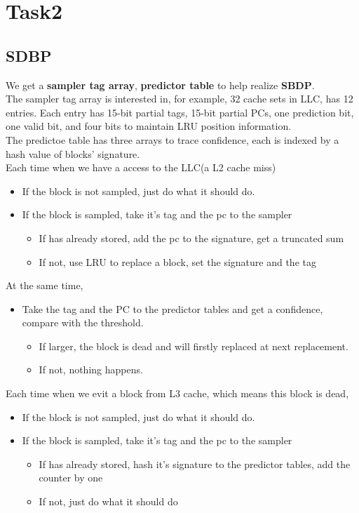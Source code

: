 \documentclass{article}
\begin{document}
\section{Task2}
\subsection{SDBP}
We get a \textbf{sampler tag array}, \textbf{predictor table} to help realize \textbf{SBDP}. \\
The sampler tag array is interested in, for example, 32 cache sets in LLC, has 12 entries. Each entry has 15-bit partial tags, 15-bit partial PCs, one prediction bit, one valid bit, and four bits to maintain LRU position information.\\
The predictoe table has three arrays to trace confidence, each is indexed by a hash value of blocks' signature.\\
Each time when we have a access to the LLC(a L2 cache miss)
\begin{itemize}
    \item If the block is not sampled, just do what it should do.
    \item If the block is sampled, take it's tag and the pc to the sampler
        \begin{itemize}
            \item If has already stored, add the pc to the signature, get a truncated sum
            \item If not, use LRU to replace a block, set the signature and the tag
        \end{itemize}
\end{itemize}
At the same time,
\begin{itemize}
    \item Take the tag and the PC to the predictor tables and get a confidence, compare with the threshold.
        \begin{itemize}
            \item If larger, the block is dead and will firstly replaced at next replacement.
            \item If not, nothing happens.
        \end{itemize}
\end{itemize}
Each time when we evit a block from L3 cache, which means this block is dead,
\begin{itemize}
    \item If the block is not sampled, just do what it should do.
    \item If the block is sampled, take it's tag and the pc to the sampler
        \begin{itemize}
            \item If has already stored, hash it's signature to the predictor tables, add the counter by one
            \item If not, just do what it should do
        \end{itemize}
\end{itemize}
\end{document}
